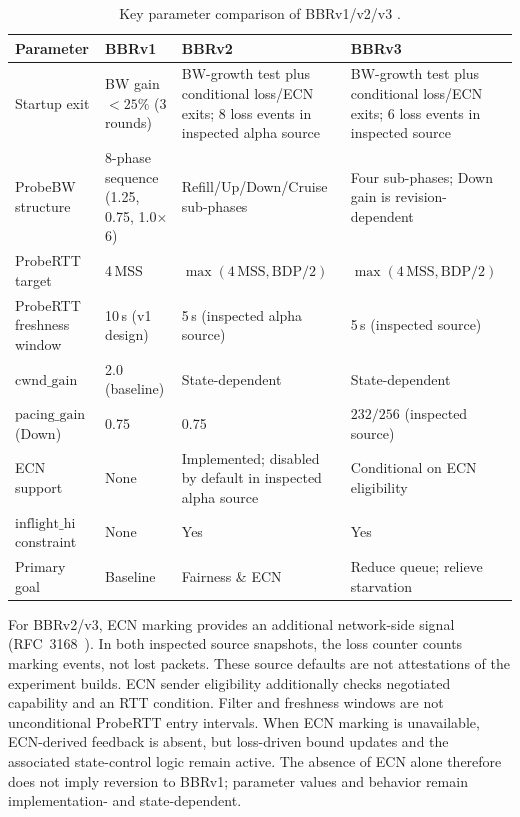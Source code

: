 \documentclass[a4paper,fleqn]{cas-sc}
\begin{document}
\begin{table}[pos=tbp]
  \caption{Key parameter comparison of BBRv1/v2/v3
    \citep{cardwell2017bbr,cardwell2019bbrv2,cardwell2023bbrv3,abrol2026bbr}.}
  \label{tab:versions}
  \small
  \begin{threeparttable}
  \begin{tabularx}{\tblwidth}{@{}p{2.8cm}XXX@{}}
    \toprule
    \textbf{Parameter} & \textbf{BBRv1} & \textbf{BBRv2} & \textbf{BBRv3} \\
    \midrule
    Startup exit &
      BW gain ${<}25\%$ (3 rounds) &
      BW-growth test plus conditional loss/ECN exits; 8 loss events in inspected alpha source &
      BW-growth test plus conditional loss/ECN exits; 6 loss events in inspected source \\
    \midrule
    ProbeBW structure &
      8-phase sequence (1.25, 0.75, 1.0$\times$6) &
      Refill/Up/Down/Cruise sub-phases &
      Four sub-phases; Down gain is revision-dependent \\
    \midrule
    ProbeRTT target     & 4\,MSS    & $\max(4\,\mathrm{MSS},\mathrm{BDP}/2)$ & $\max(4\,\mathrm{MSS},\mathrm{BDP}/2)$ \\
    ProbeRTT freshness window & 10\,s (v1 design) & 5\,s (inspected alpha source) & 5\,s (inspected source)  \\
    $\mathrm{cwnd\_gain}$ & 2.0 (baseline) & State-dependent & State-dependent \\
    $\mathrm{pacing\_gain}$ (Down) & 0.75 & 0.75 & $232/256$ (inspected source) \\
    ECN support & None & Implemented; disabled by default in inspected alpha source & Conditional on ECN eligibility \\
    $\mathrm{inflight\_hi}$ constraint & None & Yes & Yes \\
    Primary goal & Baseline & Fairness \& ECN & Reduce queue; relieve starvation \\
    \bottomrule
  \end{tabularx}
  \begin{tablenotes}
    \small
    \item For BBRv2/v3, ECN marking provides an additional network-side signal (RFC~3168~\citep{rfc3168}).
    In both inspected source snapshots, the loss counter counts marking events, not lost packets.
    These source defaults are not attestations of the experiment builds.
    ECN sender eligibility additionally checks negotiated capability and an RTT condition.
    Filter and freshness windows are not unconditional ProbeRTT entry intervals.
    When ECN marking is unavailable, ECN-derived feedback is absent, but loss-driven
    bound updates and the associated state-control logic remain active. The absence
    of ECN alone therefore does not imply reversion to BBRv1; parameter values and
    behavior remain implementation- and state-dependent.
  \end{tablenotes}
  \end{threeparttable}
\end{table}
\end{document}
